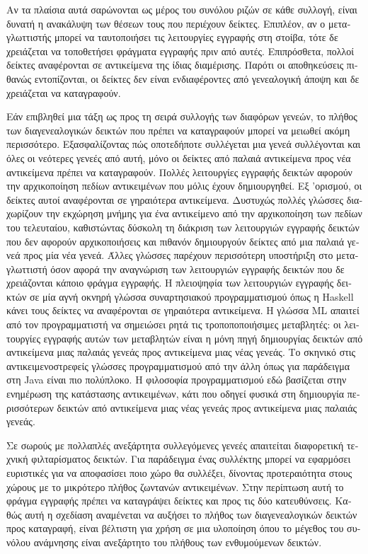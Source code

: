 \begin{greek}
Αν τα πλαίσια αυτά σαρώνονται ως μέρος του συνόλου ριζών σε
κάθε συλλογή, είναι δυνατή η ανακάλυψη των θέσεων τους που
περιέχουν δείκτες. Επιπλέον, αν ο μεταγλωττιστής μπορεί να
ταυτοποιήσει τις λειτουργίες εγγραφής στη στοίβα, τότε δε
χρειάζεται να τοποθετήσει φράγματα εγγραφής πριν από αυτές.
Επιπρόσθετα, πολλοί δείκτες αναφέρονται σε αντικείμενα της
ίδιας διαμέρισης. Παρότι οι αποθηκεύσεις πιθανώς εντοπίζονται,
οι δείκτες δεν είναι ενδιαφέροντες από γενεαλογική άποψη και
δε χρειάζεται να καταγραφούν.

Εάν επιβληθεί μια τάξη ως προς τη σειρά συλλογής των διαφόρων
γενεών, το πλήθος των διαγενεαλογικών δεικτών που πρέπει να
καταγραφούν μπορεί να μειωθεί ακόμη περισσότερο. Εξασφαλίζοντας
πώς οποτεδήποτε συλλέγεται μια γενεά συλλέγονται και όλες οι
νεότερες γενεές από αυτή, μόνο οι δείκτες από παλαιά αντικείμενα
προς νέα αντικείμενα πρέπει να καταγραφούν. Πολλές λειτουργίες
εγγραφής δεικτών αφορούν την αρχικοποίηση πεδίων αντικειμένων
που μόλις έχουν δημιουργηθεί. Εξ 'ορισμού, οι δείκτες αυτοί
αναφέρονται σε γηραιότερα αντικείμενα. Δυστυχώς πολλές γλώσσες
διαχωρίζουν την εκχώρηση μνήμης για ένα αντικείμενο από την
αρχικοποίηση των πεδίων του τελευταίου, καθιστώντας δύσκολη τη
διάκριση των λειτουργιών εγγραφής δεικτών που δεν αφορούν
αρχικοποιήσεις και πιθανόν δημιουργούν δείκτες από μια παλαιά
γενεά προς μία νέα γενεά. Άλλες γλώσσες παρέχουν περισσότερη
υποστήριξη στο μεταγλωττιστή όσον αφορά την αναγνώριση των
λειτουργιών εγγραφής δεικτών που δε χρειάζονται κάποιο φράγμα
εγγραφής. Η πλειοψηφία των λειτουργιών εγγραφής δεικτών σε μία
αγνή οκνηρή γλώσσα συναρτησιακού προγραμματισμού όπως η Haskell
κάνει τους δείκτες να αναφέρονται σε γηραιότερα αντικείμενα.
Η γλώσσα ML απαιτεί από τον προγραμματιστή να σημειώσει ρητά
τις τροποποποιήσιμες μεταβλητές: οι λειτουργίες εγγραφής αυτών
των μεταβλητών είναι η μόνη πηγή δημιουργίας δεικτών από
αντικείμενα μιας παλαιάς γενεάς προς αντικείμενα μιας νέας
γενεάς. Το σκηνικό στις αντικειμενοστρεφείς γλώσσες προγραμματισμού
από την άλλη όπως για παράδειγμα στη Java είναι πιο πολύπλοκο.
Η φιλοσοφία προγραμματισμού εδώ βασίζεται στην ενημέρωση της
κατάστασης αντικειμένων, κάτι που οδηγεί φυσικά στη δημιουργία
περισσότερων δεικτών από αντικείμενα μιας νέας γενεάς προς
αντικείμενα μιας παλαιάς γενεάς.

Σε σωρούς με πολλαπλές ανεξάρτητα συλλεγόμενες γενεές απαιτείται
διαφορετική τεχνική φιλταρίσματος δεικτών. Για παράδειγμα ένας
συλλέκτης μπορεί να εφαρμόσει ευριστικές για να αποφασίσει
ποιο χώρο θα συλλέξει, δίνοντας προτεραιότητα στους χώρους
με το μικρότερο πλήθος ζωντανών αντικειμένων. Στην περίπτωση
αυτή το φράγμα εγγραφής πρέπει να καταγράψει δείκτες και προς
τις δύο κατευθύνσεις. Καθώς αυτή η σχεδίαση αναμένεται να αυξήσει
το πλήθος των διαγενεαλογικών δεικτών προς καταγραφή, είναι
βέλτιστη για χρήση σε μια υλοποίηση όπου το μέγεθος του συνόλου
ανάμνησης είναι ανεξάρτητο του πλήθους των ενθυμούμενων
δεικτών.


\end{greek}
